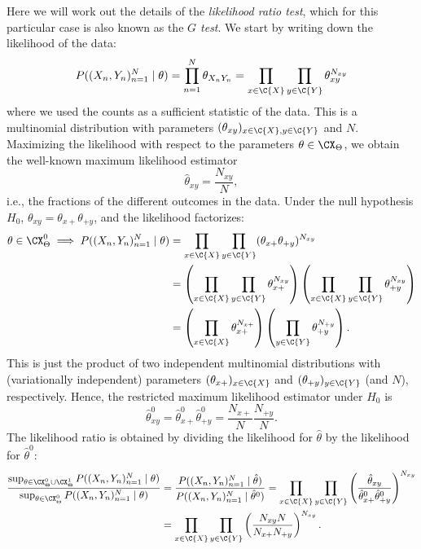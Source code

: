 Here we will work out the details of the \emph{likelihood ratio test}, which for this particular case
is also known as the \emph{$G$ test}. We start by writing down the likelihood of the data:
$$P((X_n,Y_n)_{n=1}^N \mid \theta) = \prod_{n=1}^N \theta_{X_nY_n} = \prod_{x\in\C{X}} \prod_{y\in\C{Y}} \theta_{xy}^{N_{xy}}$$
where we used the counts as a sufficient statistic of the data. 
This is a multinomial distribution with parameters $(\theta_{xy})_{x\in\C{X},y\in\C{Y}}$ and $N$.
Maximizing the likelihood with respect to the parameters $\theta \in \CX_\Theta$, we obtain the well-known maximum likelihood estimator
$$\hat \theta_{xy} = \frac{N_{xy}}{N},$$
i.e., the fractions of the different outcomes in the data.
Under the null hypothesis $H_0$, $\theta_{xy} = \theta_{x+}\theta_{+ y}$, and the likelihood factorizes:
\begin{equation*}\begin{split}
  \theta \in \CX_\Theta^0 \implies P((X_n,Y_n)_{n=1}^N \mid \theta) 
  &= \prod_{x\in\C{X}} \prod_{y\in\C{Y}} (\theta_{x+} \theta_{+ y})^{N_{xy}} \\
  &= \left(\prod_{x\in\C{X}} \prod_{y\in\C{Y}} \theta_{x+}^{N_{xy}} \right) \left(\prod_{x\in\C{X}} \prod_{y\in\C{Y}} \theta_{+ y}^{N_{xy}}\right) \\
  &= \left(\prod_{x\in\C{X}} \theta_{x+}^{N_{x+}} \right) \left(\prod_{y\in\C{Y}} \theta_{+ y}^{N_{+ y}}\right).
\end{split}\end{equation*}
This is just the product of two independent multinomial distributions with (variationally independent) parameters
$(\theta_{x+})_{x\in\C{X}}$ and $(\theta_{+ y})_{y\in\C{Y}}$ (and $N$), respectively.
Hence, the restricted maximum likelihood estimator under $H_0$ is 
$$\hat \theta^0_{xy} = \hat \theta^0_{x+} \hat \theta^0_{+ y} = \frac{N_{x+}}{N} \frac{N_{+ y}}{N}.$$
The likelihood ratio is obtained by dividing the likelihood for $\hat \theta$ by the likelihood for $\hat \theta^0$:
\begin{equation}\label{eq:indep_test_XY_likelihood_ratio}\begin{split}
\frac{\sup_{\theta\in\CX_\Theta^0\cup\CX_\Theta^1} P((X_n,Y_n)_{n=1}^N \mid \theta)}{\sup_{\theta\in\CX_\Theta^0} P((X_n,Y_n)_{n=1}^N \mid \theta)}
  & = \frac{P((X_n,Y_n)_{n=1}^N \mid \hat\theta)}{P((X_n,Y_n)_{n=1}^N \mid \hat\theta^0)}
    = \prod_{x\in\C{X}} \prod_{y\in\C{Y}} \left(\frac{\hat \theta_{xy}}{\hat \theta^0_{x+} \hat \theta^0_{+ y}}\right)^{N_{xy}} \\
  & = \prod_{x\in\C{X}} \prod_{y\in\C{Y}} \left(\frac{N_{xy} N}{N_{x+} N_{+ y}}\right)^{N_{xy}}.
\end{split}\end{equation}
